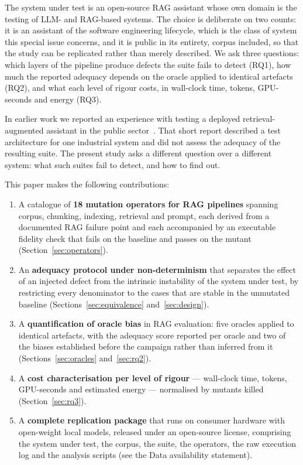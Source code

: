 \documentclass[a4paper,fleqn]{cas-dc}
\begin{document}
The system under test is an open-source RAG assistant whose own domain is the
testing of LLM- and RAG-based systems. The choice is deliberate on two counts:
it is an assistant of the software engineering lifecycle, which is the class of
system this special issue concerns, and it is public in its entirety, corpus
included, so that the study can be replicated rather than merely described. We
ask three questions: which layers of the pipeline produce defects the suite
fails to detect (RQ1), how much the reported adequacy depends on the oracle
applied to identical artefacts (RQ2), and what each level of rigour costs, in
wall-clock time, tokens, GPU-seconds and energy (RQ3).

In earlier work we reported an experience with testing a deployed
retrieval-augmented assistant in the public sector~\cite{oliveira2026sast}. That
short report described a test architecture for one industrial system and did
not assess the adequacy of the resulting suite. The present study asks a
different question over a different system: what such suites fail to detect,
and how to find out.

This paper makes the following contributions:
\begin{enumerate}
\item[(1)] A catalogue of \textbf{18 mutation operators for RAG pipelines}
  spanning corpus, chunking, indexing, retrieval and prompt, each derived from a
  documented RAG failure point and each accompanied by an executable fidelity
  check that fails on the baseline and passes on the mutant
  (Section~\ref{sec:operators}).
\item[(2)] An \textbf{adequacy protocol under non-determinism} that separates
  the effect of an injected defect from the intrinsic instability of the system
  under test, by restricting every denominator to the cases that are stable in
  the unmutated baseline (Sections~\ref{sec:equivalence}
  and~\ref{sec:design}).
\item[(3)] A \textbf{quantification of oracle bias} in RAG evaluation: five
  oracles applied to identical artefacts, with the adequacy score reported per
  oracle and two of the biases established before the campaign rather than
  inferred from it (Sections~\ref{sec:oracles} and~\ref{sec:rq2}).
\item[(4)] A \textbf{cost characterisation per level of rigour} --- wall-clock
  time, tokens, GPU-seconds and estimated energy --- normalised by mutants
  killed (Section~\ref{sec:rq3}).
\item[(5)] A \textbf{complete replication package} that runs on consumer
  hardware with open-weight local models, released under an open-source
  license, comprising the system under test, the corpus, the suite, the
  operators, the raw execution log and the analysis scripts (see the Data
  availability statement).
\end{enumerate}
\end{document}
